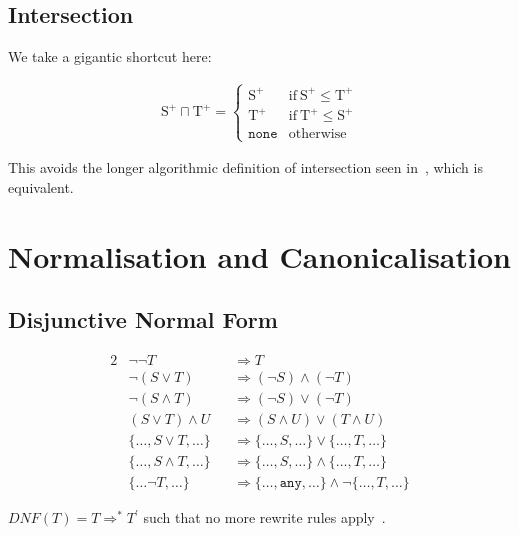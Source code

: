 \documentclass[nonacm,timestamp,manuscript]{acmart}
\newcommand{\atom}[1]{\texttt{#1}}
\newcommand{\type}{\text{T}}
\newcommand{\types}{\text{S}}
\newcommand{\postype}{{\type}^{+}}
\newcommand{\postypes}{{\types}^{+}}
\begin{document}
\subsection{Intersection}

We take a gigantic shortcut here:

\begin{definition}
\begin{align*}
  \postypes \sqcap \postype =
  \begin{cases}
    \postypes & \text{if}\ \postypes \le \postype \\
    \postype & \text{if}\ \postype \le \postypes \\
    \atom{none} & \text{otherwise}
  \end{cases}
\end{align*}
\end{definition}

This avoids the longer algorithmic definition of intersection seen
in~\cite{Pearce2013}, which is equivalent.

\section{Normalisation and Canonicalisation}

\newcommand{\rewrite}{\Longrightarrow}

\subsection{Disjunctive Normal Form}

\begin{definition}\label{def:dnf}
\begin{alignat}{2}
  & \neg \neg T && \rewrite T \\
  & \neg (S \lor T) && \rewrite (\neg S) \land (\neg T) \\
  & \neg (S \land T) && \rewrite (\neg S) \lor (\neg T) \\
  & (S \lor T) \land U && \rewrite (S \land U) \lor (T \land U) \\
  & \{ \ldots, S \lor T, \ldots \} && \rewrite \{ \ldots, S, \ldots \} \lor \{ \ldots, T, \ldots \} \\
  & \{ \ldots, S \land T, \ldots \} && \rewrite \{ \ldots, S, \ldots \} \land \{ \ldots, T, \ldots \} \\
  & \{\ldots \neg T, \ldots \} && \rewrite \{ \ldots, \atom{any} , \ldots \} \land \neg \{ \ldots, T, \ldots \}
\end{alignat}

$DNF(T) = T \rewrite^{*} T^{\prime}$ such that no more rewrite rules
apply~\cite{Pearce2013}.
\end{definition}
\end{document}
